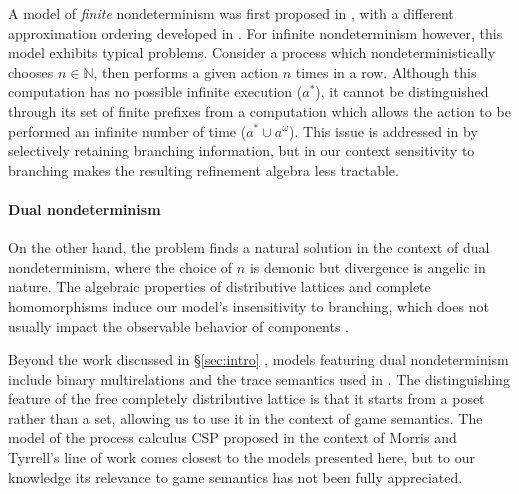 \documentclass[sigplan,screen]{acmart}
\begin{document}
A model of \emph{finite} nondeterminism
was first proposed in \citet{gsfnd},
with a different approximation ordering
developed in \citet{gseia}.
For infinite nondeterminism however,
this model exhibits typical problems.
Consider a process which nondeterministically chooses $n \in \mathbb{N}$,
then performs a given action $n$ times in a row.
Although this computation has no possible infinite execution ($a^*$),
it cannot be distinguished through its set of finite prefixes
from a computation which allows the action to be performed an
infinite number of time ($a^* \cup a^\omega$).
This issue is addressed in \citet{gsndsheaves,nacgs}
by selectively retaining branching information,
but in our context sensitivity to branching makes
the resulting refinement algebra less tractable.


\paragraph{Dual nondeterminism}

On the other hand,
the problem finds a natural solution
in the context of dual nondeterminism,
where the choice of $n$ is demonic but
divergence is angelic in nature.
The algebraic properties of
distributive lattices and
complete homomorphisms
induce our model's insensitivity to branching,
which does not usually impact
the observable behavior of components \cite{bltsp}.

Beyond the work discussed in \S\ref{sec:intro}
\cite{gc,backthesis,refcal,augtyp,dndf},
models featuring dual nondeterminism include
binary multirelations \cite{multirel,mrdnd}
and the trace semantics used in \citet{altref}.
The distinguishing feature of
the free completely distributive lattice
is that it starts from a poset rather than a set,
allowing us to use it in the context of game semantics.
The model of the process calculus CSP
proposed \cite{cspdnd} in the context of Morris and Tyrrell's line of work
comes closest to the models presented here,
but to our knowledge its relevance to game semantics
has not been fully appreciated.
\end{document}

